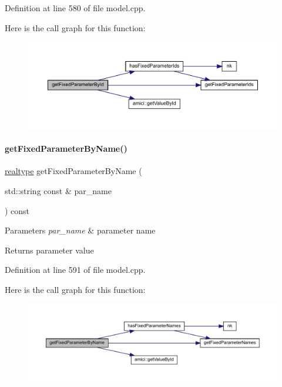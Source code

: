 Definition at line 580 of file model.\+cpp.

Here is the call graph for this function\+:
\nopagebreak
\begin{figure}[H]
\begin{center}
\leavevmode
\includegraphics[width=350pt]{classamici_1_1_model_acc647ebbeaf0be737c7c165fa77eeca5_cgraph}
\end{center}
\end{figure}
\mbox{\label{classamici_1_1_model_a99cc00a08b2f2d87d3eac047d00a7c57}} 
\paragraph{\texorpdfstring{getFixedParameterByName()}{getFixedParameterByName()}}
{\footnotesize\ttfamily \mbox{\hyperlink{namespaceamici_a1bdce28051d6a53868f7ccbf5f2c14a3}{realtype}} get\+Fixed\+Parameter\+By\+Name (\begin{DoxyParamCaption}\item[{std\+::string const \&}]{par\+\_\+name }\end{DoxyParamCaption}) const}


\begin{DoxyParams}{Parameters}
{\em par\+\_\+name} & parameter name \\
\hline
\end{DoxyParams}
\begin{DoxyReturn}{Returns}
parameter value 
\end{DoxyReturn}


Definition at line 591 of file model.\+cpp.

Here is the call graph for this function\+:
\nopagebreak
\begin{figure}[H]
\begin{center}
\leavevmode
\includegraphics[width=350pt]{classamici_1_1_model_a99cc00a08b2f2d87d3eac047d00a7c57_cgraph}
\end{center}
\end{figure}
\mbox{\label{classamici_1_1_model_adc0d24343c6fed2e797fb402f7c2d256}} 
